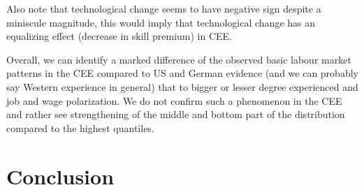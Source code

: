 \documentclass{article}
\begin{document}
Also note that technological change seems to have negative sign despite a miniscule magnitude, this would imply that technological change has an equalizing effect (decrease in skill premium) in CEE.

Overall, we can identify a marked difference of the observed basic labour market patterns in the CEE compared to US and German evidence (and we can probably say Western experience in general) that to bigger or lesser degree experienced and job and wage polarization. We do not confirm such a phenomenon in the CEE and rather see strengthening of the middle and bottom part of the distribution compared to the highest quantiles.

\section{Conclusion}
\end{document}
